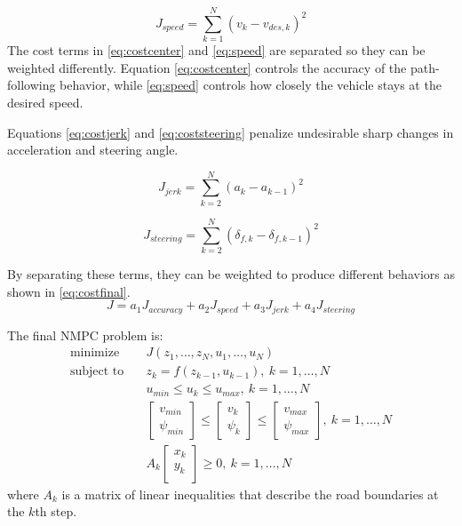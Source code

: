 \documentclass[conference]{IEEEtran}
\begin{document}
\begin{equation}
J_{speed} = \sum_{k=1}^N (v_k - v_{des,k})^2
\label{eq:speed}
\end{equation}
The cost terms in \eqref{eq:costcenter} and \eqref{eq:speed} are separated so they can be weighted differently. Equation \eqref{eq:costcenter} controls the accuracy of the path-following behavior, while \eqref{eq:speed} controls how closely the vehicle stays at the desired speed.


Equations \eqref{eq:costjerk} and \eqref{eq:coststeering} penalize undesirable sharp changes in acceleration and steering angle.

\begin{equation}
J_{jerk} = \sum_{k=2}^N (a_k - a_{k-1})^2
\label{eq:costjerk}
\end{equation}

\begin{equation}
J_{steering} = \sum_{k=2}^N (\delta_{f,k} - \delta_{f,k-1})^2
\label{eq:coststeering}
\end{equation}

By separating these terms, they can be weighted to produce different behaviors as shown in \eqref{eq:costfinal}.
\begin{equation}
J = a_1 J_{accuracy} + a_2 J_{speed} + a_3 J_{jerk} + a_4 J_{steering}
\label{eq:costfinal}
\end{equation}

The final NMPC problem is:
\begin{align}
\text{minimize}\quad& J(z_1,\dots,z_N, u_1,\dots,u_N)
\\
\text{subject to} \quad& z_{k} = f(z_{k-1}, u_{k-1}),\ k=1,\dots,N
\\
& u_{min} \leq u_k \leq u_{max},\ k=1,\dots,N
\\
& \begin{bmatrix}
v_{min}\\\psi_{min}
\end{bmatrix} \leq \begin{bmatrix}
v_k\\\psi_k
\end{bmatrix}\leq \begin{bmatrix}
v_{max}\\\psi_{max}
\end{bmatrix},\ k=1,\dots,N
\\
&
A_k\begin{bmatrix}
x_k\\y_k\\
\end{bmatrix} \geq 0,\ k=1,\dots,N
\end{align}
where $A_k$ is a matrix of linear inequalities that describe the road boundaries at the $k$th step.
\end{document}
